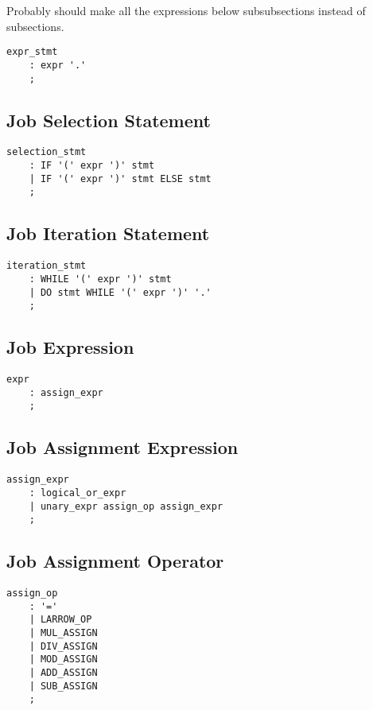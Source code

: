 \documentclass[prodmode,acmtecs]{acmsmall}
\begin{document}
Probably should make all the expressions below subsubsections instead of subsections.

\begin{lstlisting}
expr_stmt
	: expr '.'
	;
\end{lstlisting}


\subsection{Job Selection Statement}

\begin{lstlisting}
selection_stmt
	: IF '(' expr ')' stmt
	| IF '(' expr ')' stmt ELSE stmt
	;
\end{lstlisting}


\subsection{Job Iteration Statement}

\begin{lstlisting}
iteration_stmt
	: WHILE '(' expr ')' stmt
	| DO stmt WHILE '(' expr ')' '.'
	;
\end{lstlisting}


\subsection{Job Expression}

\begin{lstlisting}
expr
	: assign_expr
	;
\end{lstlisting}


\subsection{Job Assignment Expression}

\begin{lstlisting}
assign_expr
	: logical_or_expr
	| unary_expr assign_op assign_expr
	;
\end{lstlisting}

\subsection{Job Assignment Operator}

\begin{lstlisting}
assign_op
	: '='
	| LARROW_OP
	| MUL_ASSIGN
	| DIV_ASSIGN
	| MOD_ASSIGN
	| ADD_ASSIGN
	| SUB_ASSIGN
	;
\end{lstlisting}
\end{document}
